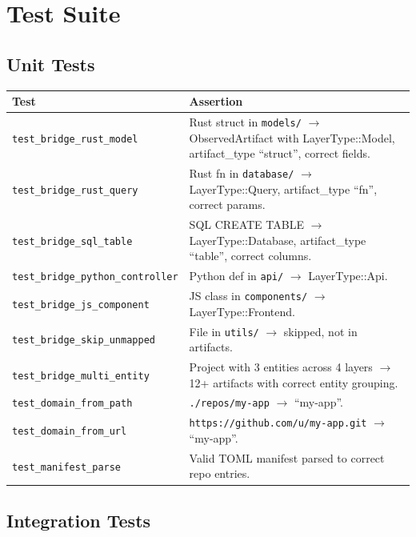 \documentclass[11pt,a4paper]{article}
\begin{document}
\section{Test Suite}

\subsection{Unit Tests}

\begin{longtable}{lp{10cm}}
\toprule
\textbf{Test} & \textbf{Assertion} \\
\midrule
\texttt{test\_bridge\_rust\_model}
  & Rust struct in \texttt{models/} $\to$ ObservedArtifact with
    LayerType::Model, artifact\_type ``struct'', correct fields. \\
\texttt{test\_bridge\_rust\_query}
  & Rust fn in \texttt{database/} $\to$ LayerType::Query,
    artifact\_type ``fn'', correct params. \\
\texttt{test\_bridge\_sql\_table}
  & SQL CREATE TABLE $\to$ LayerType::Database,
    artifact\_type ``table'', correct columns. \\
\texttt{test\_bridge\_python\_controller}
  & Python def in \texttt{api/} $\to$ LayerType::Api. \\
\texttt{test\_bridge\_js\_component}
  & JS class in \texttt{components/} $\to$ LayerType::Frontend. \\
\texttt{test\_bridge\_skip\_unmapped}
  & File in \texttt{utils/} $\to$ skipped, not in artifacts. \\
\texttt{test\_bridge\_multi\_entity}
  & Project with 3 entities across 4 layers $\to$ 12+ artifacts
    with correct entity grouping. \\
\texttt{test\_domain\_from\_path}
  & \texttt{./repos/my-app} $\to$ ``my-app''. \\
\texttt{test\_domain\_from\_url}
  & \texttt{https://github.com/u/my-app.git} $\to$ ``my-app''. \\
\texttt{test\_manifest\_parse}
  & Valid TOML manifest parsed to correct repo entries. \\
\bottomrule
\end{longtable}

\subsection{Integration Tests}
\end{document}
